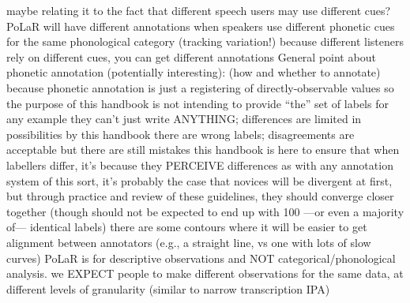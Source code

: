 {}\markdownRendererUlBeginTight
\markdownRendererUlItem maybe relating it to the fact that different speech users may use different cues?\markdownRendererUlItemEnd 
\markdownRendererUlItem PoLaR will have different annotations when speakers use different phonetic cues for the same phonological category (tracking variation!)\markdownRendererUlItemEnd 
\markdownRendererUlItem because different listeners rely on different cues, you can get different annotations\markdownRendererUlItemEnd 
\markdownRendererUlEndTight \markdownRendererUlItemEnd 
\markdownRendererUlEndTight \markdownRendererUlItemEnd 
\markdownRendererUlItem General point about phonetic annotation (potentially interesting):  (how and whether to annotate) because phonetic annotation is just a registering of directly-observable values\markdownRendererInterblockSeparator
{}\markdownRendererUlBeginTight
\markdownRendererUlItem so the purpose of this handbook is not intending to provide  “the” set of labels for any example\markdownRendererInterblockSeparator
{}\markdownRendererUlBeginTight
\markdownRendererUlItem they can’t just write ANYTHING; differences are limited in possibilities by this handbook\markdownRendererInterblockSeparator
{}\markdownRendererUlBeginTight
\markdownRendererUlItem there are wrong labels; disagreements are acceptable but there are still mistakes\markdownRendererUlItemEnd 
\markdownRendererUlEndTight \markdownRendererUlItemEnd 
\markdownRendererUlItem this handbook is here to ensure that when labellers differ, it’s because they PERCEIVE differences\markdownRendererInterblockSeparator
{}\markdownRendererUlBeginTight
\markdownRendererUlItem as with any annotation system of this sort, it’s probably the case that novices will be divergent at first, but through practice and review of these guidelines, they should converge closer together (though should not be expected to end up with 100\markdownRendererPercentSign{} —or even a majority of— identical labels)\markdownRendererUlItemEnd 
\markdownRendererUlItem there are some contours where it will be easier to get alignment between annotators (e.g., a straight line, vs one with lots of slow curves)\markdownRendererUlItemEnd 
\markdownRendererUlEndTight \markdownRendererUlItemEnd 
\markdownRendererUlEndTight \markdownRendererUlItemEnd 
\markdownRendererUlItem PoLaR is for descriptive observations and NOT categorical/phonological analysis. we EXPECT people to make different observations for the same data, at different levels of granularity (similar to narrow transcription IPA)\markdownRendererInterblockSeparator
